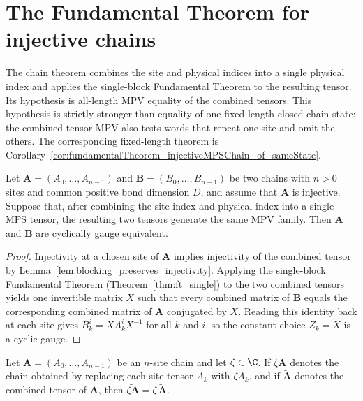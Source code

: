 \section{The Fundamental Theorem for injective chains}%
\label{sec:ft_chain}

The chain theorem combines the site and physical indices into a single
physical index and applies the single-block Fundamental Theorem to the
resulting tensor. Its hypothesis is all-length MPV equality of the
combined tensors. This hypothesis is strictly stronger than equality of one
fixed-length closed-chain state: the combined-tensor MPV also tests words that
repeat one site and omit the others. The corresponding fixed-length theorem is
Corollary~\ref{cor:fundamentalTheorem_injectiveMPSChain_of_sameState}.

\begin{theorem}%
    \label{thm:fundamentalTheorem_injective_chain}
    \leanok
    Let $\mathbf{A} = (A_0, \ldots, A_{n-1})$ and
    $\mathbf{B} = (B_0, \ldots, B_{n-1})$ be two chains with $n>0$ sites
    and common positive bond dimension $D$, and assume that $\mathbf{A}$ is
    injective.
    Suppose that, after combining the site index and physical index into a
    single MPS tensor, the resulting two tensors generate the same MPV
    family. Then $\mathbf{A}$ and $\mathbf{B}$ are cyclically gauge
    equivalent.
\end{theorem}

\begin{proof}
    \leanok
    Injectivity at a chosen site of $\mathbf{A}$ implies injectivity of
    the combined tensor by Lemma~\ref{lem:blocking_preserves_injectivity}.
    Applying the single-block Fundamental Theorem
    (Theorem~\ref{thm:ft_single}) to the two combined tensors
    yields one invertible matrix $X$ such that every combined matrix of
    $\mathbf{B}$ equals the corresponding combined matrix of
    $\mathbf{A}$ conjugated by $X$.
    Reading this identity back at each site gives
    $B_k^i = X A_k^i X^{-1}$ for all $k$ and $i$, so the constant choice
    $Z_k = X$ is a cyclic gauge.
\end{proof}

\begin{lemma}%
    \label{lem:chainCombinedTensor_smul_chain}
    \leanok
    Let $\mathbf{A} = (A_0, \ldots, A_{n-1})$ be an $n$-site chain and let
    $\zeta \in \C$. If $\zeta \mathbf{A}$ denotes the chain obtained by
    replacing each site tensor $A_k$ with $\zeta A_k$, and if
    $\widetilde{\mathbf{A}}$ denotes the combined tensor of $\mathbf{A}$,
    then $\widetilde{\zeta \mathbf{A}}=\zeta\,\widetilde{\mathbf{A}}$.
\end{lemma}

